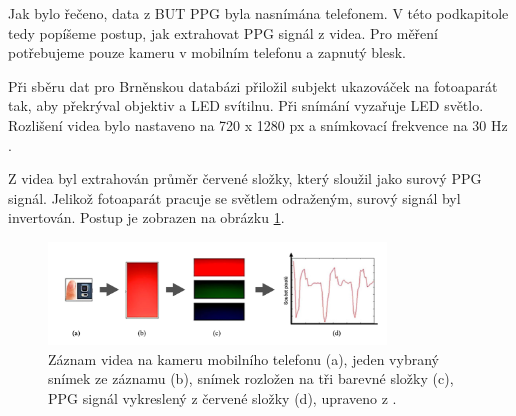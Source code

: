 Jak bylo řečeno, data z BUT PPG byla nasnímána telefonem.
V této podkapitole tedy popíšeme postup, jak extrahovat PPG signál z videa.
Pro měření potřebujeme pouze kameru v mobilním telefonu a zapnutý blesk. 

Při sběru dat pro Brněnskou databázi přiložil subjekt ukazováček na fotoaparát tak, aby překrýval objektiv a LED svítilnu.
Při snímání vyzařuje LED světlo. Rozlišení videa bylo nastaveno na 720 x 1280 px a snímkovací frekvence na 30 Hz \cite{ENIKÖ}.

Z videa byl extrahován průměr červené složky, který sloužil jako surový PPG signál.
Jelikož fotoaparát pracuje se světlem odraženým, surový signál byl invertován.
Postup je zobrazen na obrázku \ref{fig:videoZaznamPPG}.

\begin{figure}[h]
	\centering
	\includegraphics[width=0.8\textwidth]{./obrazky/videoZaznamPPG.png}
	\caption[Získání PPG signálu pro databázi BUT PPG]{Záznam videa na kameru mobilního telefonu (a), jeden vybraný snímek ze záznamu (b), snímek rozložen na tři barevné složky (c), PPG signál vykreslený z červené složky (d), upraveno z \cite{Siddiqui2016}.}
	\label{fig:videoZaznamPPG}
\end{figure}
